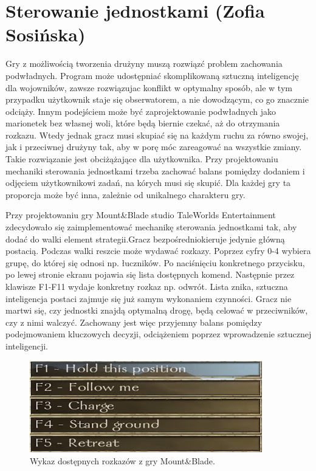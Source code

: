 \section{Sterowanie jednostkami (Zofia Sosińska)}\label{chap:mb}
Gry z możliwością tworzenia drużyny muszą rozwiązć problem zachowania podwładnych. Program może udostępniać
skomplikowaną sztuczną inteligencję dla wojowników, zawsze rozwiązujac konflikt w optymalny sposób, ale w tym przypadku 
użytkownik staje się obserwatorem, a nie dowodzącym, co go znacznie odciąży. Innym podejściem może być zaprojektowanie podwładnych jako 
marionetek bez własnej woli, które będą biernie czekać, aż do otrzymania rozkazu. Wtedy jednak gracz musi skupiać się na 
każdym ruchu za równo swojej, jak i przeciwnej drużyny tak, aby w porę móc zareagować na wszystkie zmiany. Takie rozwiązanie 
jest obciżążające dla użytkownika. Przy projektowaniu mechaniki sterowania jednostkami trzeba zachować balans pomiędzy 
dodaniem i odjęciem użytkownikowi zadań, na kórych musi się skupić. Dla każdej gry ta proporcja może być inna, zależnie
od unikalnego charakteru gry.

Przy projektowaniu gry Mount\&Blade studio TaleWorlds Entertainment zdecydowało się zaimplementować mechanikę sterowania jednostkami tak, aby 
dodać do walki element strategii.Gracz bezpośredniokieruje jedynie główną postacią. Podczas walki reszcie może wydawać rozkazy. Poprzez
cyfry 0-4 wybiera grupę, do której się odnosi np. łuczników. Po naciśnięciu konkretnego przycisku, po lewej stronie ekranu pojawia się lista dostępnych komend.
Następnie przez klawisze F1-F11 wydaje konkretny rozkaz np. odwrót. Lista znika, sztuczna inteligencja postaci zajmuje się już samym wykonaniem czynności. 
Gracz nie martwi się, czy jednostki znajdą optymalną drogę, 
będą celować w przeciwników, czy z nimi walczyć. Zachowany jest więc przyjemny balans pomiędzy podejmowaniem kluczowych decyzji,
odciążeniem poprzez wprowadzenie sztucznej inteligencji.

\begin{figure}[h!tbp]
    \centering
    \includegraphics[width=0.9\textwidth]{images/ui/commandsMountBla.png}
    \caption{Wykaz dostępnych rozkazów z gry Mount\&Blade.}\label{fig:MountnBlade}
    \label{fig:mnb}
\end{figure}
